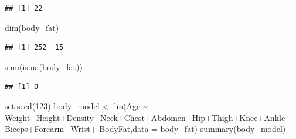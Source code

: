 \documentclass[
]{article}
\newenvironment{Shaded}{\begin{snugshade}}{\end{snugshade}}
\newcommand{\AttributeTok}[1]{\textcolor[rgb]{0.77,0.63,0.00}{#1}}
\newcommand{\DecValTok}[1]{\textcolor[rgb]{0.00,0.00,0.81}{#1}}
\newcommand{\FunctionTok}[1]{\textcolor[rgb]{0.00,0.00,0.00}{#1}}
\newcommand{\NormalTok}[1]{#1}
\newcommand{\OtherTok}[1]{\textcolor[rgb]{0.56,0.35,0.01}{#1}}
\newcommand{\SpecialCharTok}[1]{\textcolor[rgb]{0.00,0.00,0.00}{#1}}
\begin{document}
\begin{verbatim}
## [1] 22
\end{verbatim}

\begin{Shaded}
\begin{Highlighting}[]
\FunctionTok{dim}\NormalTok{(body\_fat)}
\end{Highlighting}
\end{Shaded}

\begin{verbatim}
## [1] 252  15
\end{verbatim}

\begin{Shaded}
\begin{Highlighting}[]
\FunctionTok{sum}\NormalTok{(}\FunctionTok{is.na}\NormalTok{(body\_fat))}
\end{Highlighting}
\end{Shaded}

\begin{verbatim}
## [1] 0
\end{verbatim}

\newpage

\begin{Shaded}
\begin{Highlighting}[]
\FunctionTok{set.seed}\NormalTok{(}\DecValTok{123}\NormalTok{)}
\NormalTok{body\_model }\OtherTok{\textless{}{-}} \FunctionTok{lm}\NormalTok{(Age }\SpecialCharTok{\textasciitilde{}}\NormalTok{ Weight}\SpecialCharTok{+}\NormalTok{Height}\SpecialCharTok{+}\NormalTok{Density}\SpecialCharTok{+}\NormalTok{Neck}\SpecialCharTok{+}\NormalTok{Chest}\SpecialCharTok{+}\NormalTok{Abdomen}\SpecialCharTok{+}\NormalTok{Hip}\SpecialCharTok{+}\NormalTok{Thigh}\SpecialCharTok{+}\NormalTok{Knee}\SpecialCharTok{+}\NormalTok{Ankle}\SpecialCharTok{+}
\NormalTok{                   Biceps}\SpecialCharTok{+}\NormalTok{Forearm}\SpecialCharTok{+}\NormalTok{Wrist}\SpecialCharTok{+}\NormalTok{ BodyFat,}\AttributeTok{data =}\NormalTok{ body\_fat)}
\FunctionTok{summary}\NormalTok{(body\_model)}
\end{Highlighting}
\end{Shaded}
\end{document}
